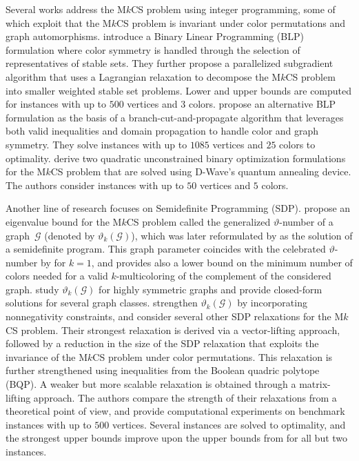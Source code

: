 \documentclass[11pt, a4paper]{article}
\newcommand{\mc}{\mathcal}
\begin{document}
Several works address the M$k$CS problem using integer programming, some of which exploit that the M$k$CS problem is invariant under color permutations and graph automorphisms.
\citet{Campelo2010ILPLagr} introduce a Binary Linear Programming (BLP) formulation where color symmetry is handled through the selection of representatives of stable sets. 
They further propose a parallelized subgradient algorithm that uses a Lagrangian relaxation to decompose the M$k$CS problem into smaller weighted stable set problems. 
Lower and upper bounds are computed for instances with up to $500$ vertices and $3$ colors.
\citet{Januschowski2011ILPSym, Januschowski2011MkCS} propose an alternative BLP formulation as the basis of a branch-cut-and-propagate algorithm that leverages both valid inequalities and domain propagation to handle color and graph symmetry. 
They solve instances with up to $1085$ vertices and $25$ colors to optimality.
\citet{Quintero2022Quantum} derive two quadratic unconstrained binary optimization formulations for the M$k$CS problem that are solved using D-Wave’s quantum annealing device. 
The authors consider instances with up to $50$ vertices and $5$ colors.

Another line of research focuses on Semidefinite Programming (SDP).
\citet{Narasimhan1990GenTheta} propose an eigenvalue bound for the M$k$CS problem called the generalized $\vartheta$-number of a graph~$\mc{G}$ (denoted by $\vartheta_k (\mc{G})$), which was later reformulated by \citet{Alizadeh1995SDPGenTheta} as the solution of a semidefinite program. 
This graph parameter coincides with the celebrated $\vartheta$-number by \citet{Lovasz1979} for $k=1$, and provides also a lower bound on the minimum number of colors needed for a valid $k$-multicoloring of the complement of the considered graph.
\citet{Sinjorgo2022GenVartheta} study $\vartheta_k (\mc{G})$ for highly symmetric graphs and provide closed-form solutions  for several graph classes.
\citet{Kuryatnikova2022MkCSProblem} strengthen $\vartheta_k (\mc{G})$ by incorporating nonnegativity constraints, and consider several other SDP relaxations for the  M$k$CS problem.
Their strongest relaxation is derived via a vector-lifting approach, followed by a reduction in the size of the SDP relaxation that exploits the invariance of the M$k$CS problem under color permutations. 
This relaxation is further strengthened using inequalities from the Boolean quadric polytope (BQP).
A weaker but more scalable relaxation is obtained through a matrix-lifting approach.
The authors compare the strength of their relaxations from a theoretical point of view, and provide computational experiments on benchmark instances with up to $500$ vertices. 
Several instances are solved to optimality, and the strongest upper bounds improve upon the upper bounds from \cite{Campelo2010ILPLagr} for all but two instances.
\end{document}
